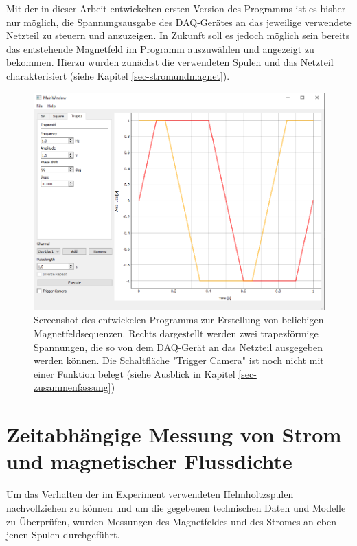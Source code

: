 \documentclass[page,pdftex,12pt,a4paper,twoside,openright]{scrbook}
\begin{document}
Mit der in dieser Arbeit entwickelten ersten Version des Programms ist es bisher nur möglich, die Spannungsausgabe des DAQ-Gerätes an das jeweilige verwendete Netzteil zu steuern und anzuzeigen. In Zukunft soll es jedoch möglich sein bereits das entstehende Magnetfeld im Programm auszuwählen und angezeigt zu bekommen. Hierzu wurden zunächst die verwendeten Spulen und das Netzteil charakterisiert (siehe Kapitel \ref{sec-stromundmagnet}).

\begin{figure}[H]
\centering
\includegraphics[width=\textwidth]{img/prog.png}
\caption{\label{fig-prog}
Screenshot des entwickelen Programms zur Erstellung von beliebigen Magnetfeldsequenzen. Rechts dargestellt werden zwei trapezförmige Spannungen, die so von dem DAQ-Gerät an das Netzteil ausgegeben werden können. Die Schaltfläche "Trigger Camera" ist noch nicht mit einer Funktion belegt (siehe Ausblick in Kapitel \ref{sec-zusammenfassung})}
\end{figure}

\section{Zeitabhängige Messung von Strom und magnetischer Flussdichte \label{sec-stromundmagnet}}
\label{sec:org17135af}
Um das Verhalten der im Experiment verwendeten Helmholtzspulen nachvollziehen zu können und um die gegebenen technischen Daten und Modelle zu Überprüfen, wurden Messungen des Magnetfeldes und des Stromes an eben jenen Spulen durchgeführt.
\end{document}
